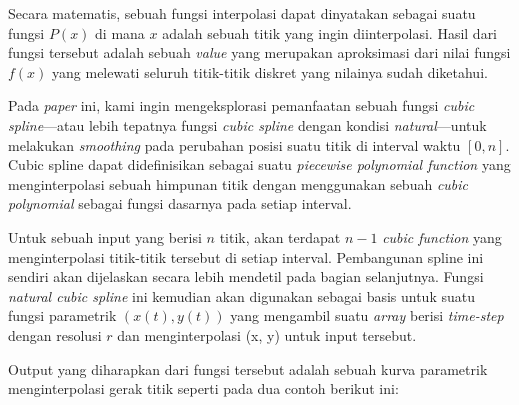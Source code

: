 \documentclass[journal,12pt,onecolumn,a4paper]{IEEEtran}
\begin{document}
Secara matematis, sebuah fungsi interpolasi dapat dinyatakan sebagai suatu fungsi \(P(x)\) di mana \(x\) adalah sebuah titik yang ingin diinterpolasi. Hasil dari fungsi tersebut adalah sebuah \emph{value} yang merupakan aproksimasi dari nilai fungsi \(f(x)\) yang melewati seluruh titik-titik diskret yang nilainya sudah diketahui.

Pada \emph{paper} ini, kami ingin mengeksplorasi pemanfaatan sebuah fungsi \emph{cubic spline}—atau lebih tepatnya fungsi \emph{cubic spline} dengan kondisi \emph{natural}—untuk melakukan \emph{smoothing} pada perubahan posisi suatu titik di interval waktu \([0, n]\). Cubic spline dapat didefinisikan sebagai suatu \emph{piecewise polynomial function} yang menginterpolasi sebuah himpunan titik dengan menggunakan sebuah \emph{cubic polynomial} sebagai fungsi dasarnya pada setiap interval.

Untuk sebuah input yang berisi \(n\) titik, akan terdapat \(n-1\) \emph{cubic function} yang menginterpolasi titik-titik tersebut di setiap interval. Pembangunan spline ini sendiri akan dijelaskan secara lebih mendetil pada bagian selanjutnya. Fungsi \emph{natural cubic spline} ini kemudian akan digunakan sebagai basis untuk suatu fungsi parametrik \((x(t), y(t))\) yang mengambil suatu \emph{array} berisi \emph{time-step} dengan resolusi \(r\) dan menginterpolasi (x, y) untuk input tersebut.

Output yang diharapkan dari fungsi tersebut adalah sebuah kurva parametrik menginterpolasi gerak titik seperti pada dua contoh berikut ini:
\end{document}
